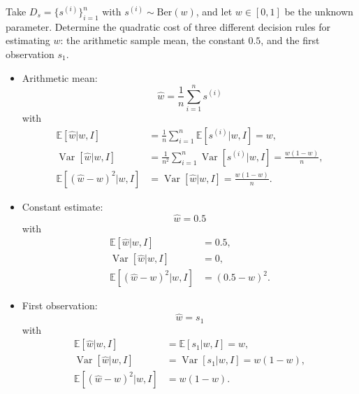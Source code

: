 \begin{example}
	Take $D_s= \{s^{(i)}\}_{i=1}^n$ with $s^{(i)} \sim \mathrm{Ber}(w)$, and let $w\in [0,1]$ be the unknown parameter. Determine the quadratic cost of three different decision rules for estimating $w$: the arithmetic sample mean, the constant $0.5$, and the first observation $s_1$.
	
	\begin{itemize}
		\item Arithmetic mean:
		\begin{equation}
			\hat{w} = \frac{1}{n} \sum_{i=1}^n s^{(i)}
		\end{equation}
		with
		\begin{equation}
			\begin{split}
				\mathbb{E}[\hat{w}|w,I] &= \frac{1}{n} \sum_{i=1}^n \mathbb{E}[s^{(i)}|w,I] = w,\\
				\operatorname{Var}[\hat{w}|w,I] &= \frac{1}{n^2} \sum_{i=1}^n \operatorname{Var}[s^{(i)}|w,I] = \frac{w(1-w)}{n},\\
				\mathbb{E}[(\hat{w}-w)^2|w,I] &= \operatorname{Var}[\hat{w}|w,I] = \frac{w(1-w)}{n}.
			\end{split}
		\end{equation}
		
		\item Constant estimate:
		\begin{equation}
			\hat{w} = 0.5
		\end{equation}
		with
		\begin{equation}
			\begin{split}
				\mathbb{E}[\hat{w}|w,I] &= 0.5,\\
				\operatorname{Var}[\hat{w}|w,I] &= 0,\\
				\mathbb{E}[(\hat{w}-w)^2|w,I] &= (0.5 - w)^2.
			\end{split}
		\end{equation}
		
		\item First observation:
		\begin{equation}
			\hat{w} = s_1
		\end{equation}
		with
		\begin{equation}
			\begin{split}
				\mathbb{E}[\hat{w}|w,I] &= \mathbb{E}[s_1|w,I] = w,\\
				\operatorname{Var}[\hat{w}|w,I] &= \operatorname{Var}[s_1|w,I] = w(1-w),\\
				\mathbb{E}[(\hat{w}-w)^2|w,I] &= w(1-w).
			\end{split}
		\end{equation}
	\end{itemize}
	

\end{example}
